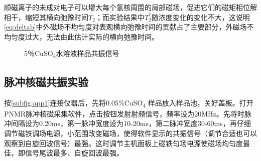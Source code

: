 	顺磁离子的未成对电子可以增大每个氢核周围的局部磁场，促进它们的磁矩相位解相干，缩短其横向弛豫时间$T_2$；而实验结果中$T_2^*$随浓度变化的变化不大，这说明\cref{eq:deltab}中外磁场不均匀度对表观横向弛豫时间的贡献占了主要部分，外磁场不均匀度过大，无法由此估计实际的横向弛豫时间。
	\begin{figure}[htbp]
		\centering
		\hspace{1cm}
		\caption{5％CuSO\textsubscript{4}水溶液样品共振信号}\label{fig:ContinuousCompare}
	\end{figure}

\subsection{脉冲核磁共振实验} %
	\label{sub:脉冲核磁共振实验}
	\par 按\cref{subfig:app1}连接仪器后，先将0.05\%CuSO\textsubscript{4} 样品放入样品池，关好盖板。打开PNMR脉冲核磁采集软件，点击按钮发射射频信号，频率设为20MHz。先将时脉冲间隔设为0.20ms，第一脉冲宽度设为10-20ms，第二脉冲宽度30-60ms，再仔细调节磁铁调场电源，小范围改变磁场，使得软件显示的共振信号（调节合适也可以观察到自旋回波信号）最强。这时调节主机面板上磁铁匀场电源使磁场均匀度最佳，即信号尾波最多、自旋回波最强。
